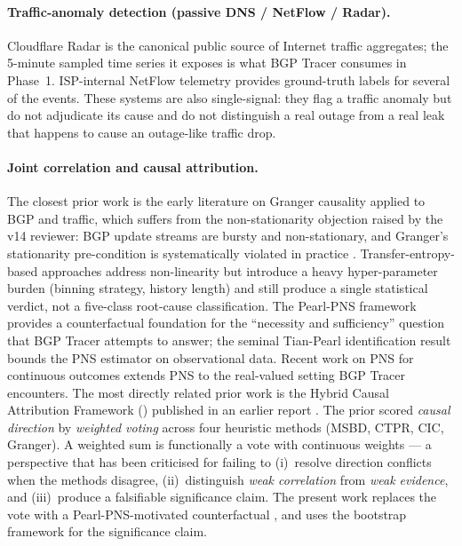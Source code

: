 \paragraph{Traffic-anomaly detection (passive
DNS / NetFlow / Radar).} Cloudflare Radar
\cite{cloudflare-2025-radar} is the canonical public
source of Internet traffic aggregates; the 5-minute
sampled time series it exposes is what BGP Tracer
consumes in Phase~1. ISP-internal NetFlow telemetry
\cite{kentik-2025-blog,kentik} provides ground-truth
labels for several of the events. These systems
are also single-signal: they flag a traffic anomaly
but do not adjudicate its cause and do not
distinguish a real outage from a real leak that
happens to cause an outage-like traffic drop.

\paragraph{Joint correlation and causal attribution.}
The closest prior work is the early literature on
Granger causality \cite{granger-1969-investigating,
granger-1980-testing,granger-2004-prize} applied to
BGP and traffic, which suffers from the
non-stationarity objection raised by the v14
reviewer: BGP update streams are bursty and
non-stationary, and Granger's stationarity
pre-condition is systematically violated in
practice \cite{besserve-2010-te,barnett-2009-granger-network}.
Transfer-entropy-based approaches
\cite{schreiber-2000-te,besserve-2010-te} address
non-linearity but introduce a heavy hyper-parameter
burden (binning strategy, history length) and still
produce a single statistical verdict, not a five-class
root-cause classification. The Pearl-PNS framework
\cite{pearl-1995-pns,pearl-causality-2009,
pearl-2014-pns-3,shpitser-2008-pns} provides a
counterfactual foundation for the ``necessity and
sufficiency'' question that BGP Tracer
attempts to answer; the seminal Tian-Pearl
identification result \cite{tian-pearl-2000} bounds
the PNS estimator on observational data. Recent
work on PNS for continuous outcomes
\cite{duarte2024,malinsky2018} extends PNS to the
real-valued setting BGP Tracer encounters. The
most directly related prior work is the Hybrid
Causal Attribution Framework (\hcaf) published in
an earlier report \cite{hcaf-v1}. The prior \hcaf{}
scored \emph{causal direction} by \emph{weighted
voting} across four heuristic methods (MSBD, CTPR,
CIC, Granger). A weighted sum is functionally a
vote with continuous weights --- a perspective
that has been criticised for failing to
(i)~resolve direction conflicts when the methods
disagree, (ii)~distinguish \emph{weak correlation}
from \emph{weak evidence}, and (iii)~produce a
falsifiable significance claim. The present work
replaces the vote with a Pearl-PNS-motivated
counterfactual \cite{pearl-causality-2009,
imai-2010-mediation,van-der-laan-2014-target,
rubin-2005-causal}, and uses the bootstrap
framework \cite{efron-1979-bootstrap,
efron-bootstrap-book-1993,phipson-2010-permutation}
for the significance claim.

